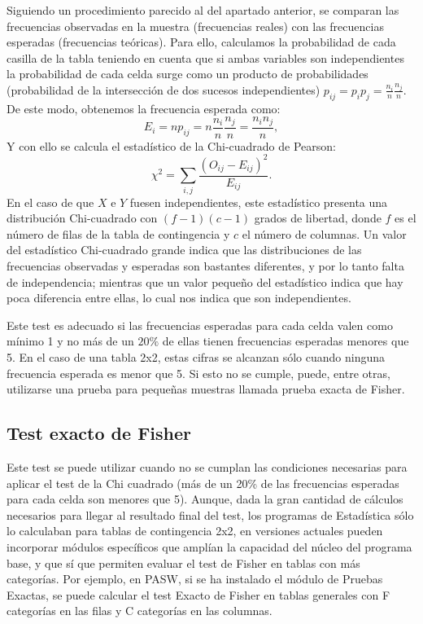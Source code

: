 Siguiendo un procedimiento parecido al del apartado anterior, se
comparan las frecuencias observadas en la muestra (frecuencias
reales) con las frecuencias esperadas (frecuencias teóricas). Para
ello, calculamos la probabilidad de cada casilla de la tabla
teniendo en cuenta que si ambas variables son independientes la
probabilidad de cada celda surge como un producto de
probabilidades (probabilidad de la intersección de dos sucesos
independientes) $p_{ij}=p_ip_j=\frac{n_i}{n}\frac{n_j}{n}$. De este modo,
obtenemos la frecuencia esperada como:
\[E_i=np_{ij}=n\frac{n_i}{n}\frac{n_j}{n}=\frac{n_in_j}{n},\]
Y con ello se calcula el estadístico de la Chi-cuadrado de Pearson:
\[
\chi^2 = \sum_{i,j}\frac{(O_{ij}-E_{ij})^2}{E_{ij}}.
\]
En el caso de que $X$ e $Y$ fuesen independientes, este
estadístico presenta una distribución Chi-cuadrado con
$(f-1)(c-1)$ grados de libertad, donde $f$ es el número de filas
de la tabla de contingencia y $c$ el número de columnas. Un valor
del estadístico Chi-cuadrado grande indica que las distribuciones
de las frecuencias observadas y esperadas son bastantes
diferentes, y por lo tanto falta de independencia; mientras que un
valor pequeño del estadístico indica que hay poca diferencia entre
ellas, lo cual nos indica que son independientes.

Este test es adecuado si las frecuencias esperadas para cada celda
valen como mínimo 1 y no más de un $20\%$ de ellas tienen
frecuencias esperadas menores que 5. En el caso de una tabla 2x2,
estas cifras se alcanzan sólo cuando ninguna frecuencia esperada
es menor que 5. Si esto no se cumple, puede, entre otras,
utilizarse una prueba para pequeñas muestras llamada prueba exacta
de Fisher.


\subsection{Test exacto de Fisher}
Este test se puede utilizar cuando no se cumplan las condiciones necesarias para aplicar el test de la Chi cuadrado (más de un 20\% de las frecuencias esperadas para cada celda son menores que 5). Aunque, dada la gran cantidad de cálculos necesarios para llegar al resultado final del test, los programas de Estadística sólo lo calculaban para tablas de contingencia 2x2, en versiones actuales pueden incorporar módulos específicos que amplían la capacidad del núcleo del programa base, y que sí que permiten evaluar el test de Fisher en tablas con más categorías. Por ejemplo, en PASW, si se ha instalado el módulo de Pruebas Exactas, se puede calcular el test Exacto de Fisher en tablas generales con F categorías en las filas y  C categorías en las columnas.

